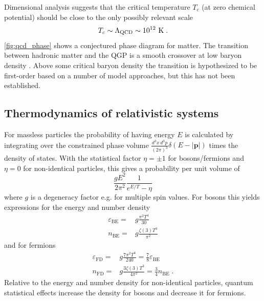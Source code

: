 Dimensional analysis suggests that the critical temperature $T_c$ (at zero chemical potential) should be close to the only possibly relevant scale
\[
T_c \sim \Lambda_\textrm{QCD} \sim 10^{12}~\mathrm{K}\; .
\]
\cref{fig:qcd_phase} shows a conjectured phase diagram for \qcd matter.
The transition between hadronic matter and the QGP is a smooth crossover at low baryon density \cite{Aoki:2006we}.
Above some critical baryon density the transition is hypothesized to be first-order based on a number of model approaches, but this has not been established.

\subsection{Thermodynamics of relativistic systems}
For massless particles the probability of having energy $E$ is calculated by integrating over the constrained phase volume \( \frac{d^3 x \, d^3 p}{(2\pi)^3} \delta\left( E - |\mathbf{p}|\right)\) times the density of states.
With the statistical factor $\eta=\pm1$ for bosons/fermions and $\eta=0$ for non-identical particles, this gives a probability per unit volume of
\begin{equation}
\frac{g E^2}{2\pi^2} \frac{1}{e^{E/T} - \eta}
\end{equation}
where $g$ is a degeneracy factor e.g. for multiple spin values.
For bosons this yields expressions for the energy and number density
\begin{align}
  \varepsilon_\textrm{BE} =& g\frac{\pi^2 T^4}{30} \\
  n_\textrm{BE} =& g\frac{\zeta(3) T^3}{\pi^2}
\end{align}
and for fermions
\begin{align}
  \varepsilon_\textrm{FD} =& g\frac{7 \pi^2 T^4}{240} = \frac{7}{8} \varepsilon_\textrm{BE} \\
  n_\textrm{FD} =& g\frac{3 \zeta(3) T^3}{4 \pi^2} = \frac{3}{4} n_\textrm{BE} \; .
\end{align}
Relative to the energy and number density for non-identical particles, quantum statistical effects increase the density for bosons and decrease it for fermions.

